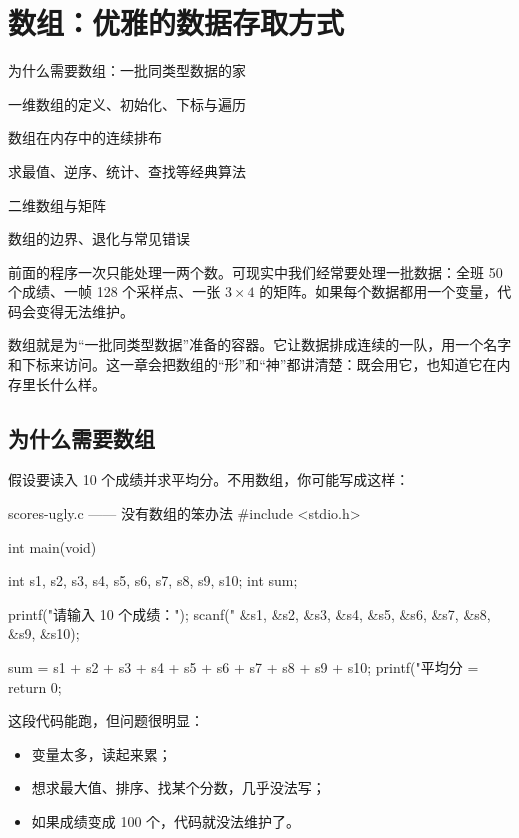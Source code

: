 \chapter{数组：优雅的数据存取方式}

\begin{introduction}
  \item 为什么需要数组：一批同类型数据的家
  \item 一维数组的定义、初始化、下标与遍历
  \item 数组在内存中的连续排布
  \item 求最值、逆序、统计、查找等经典算法
  \item 二维数组与矩阵
  \item 数组的边界、退化与常见错误
\end{introduction}


前面的程序一次只能处理一两个数。可现实中我们经常要处理一批数据：全班 50 个成绩、一帧 128 个采样点、一张 $3 \times 4$ 的矩阵。如果每个数据都用一个变量，代码会变得无法维护。

数组就是为“一批同类型数据”准备的容器。它让数据排成连续的一队，用一个名字和下标来访问。这一章会把数组的“形”和“神”都讲清楚：既会用它，也知道它在内存里长什么样。

\section{为什么需要数组}

假设要读入 10 个成绩并求平均分。不用数组，你可能写成这样：

\begin{codebox}{scores-ugly.c —— 没有数组的笨办法}
#include <stdio.h>

int main(void)
{
    int s1, s2, s3, s4, s5, s6, s7, s8, s9, s10;
    int sum;

    printf("请输入 10 个成绩：");
    scanf("%
          &s1, &s2, &s3, &s4, &s5,
          &s6, &s7, &s8, &s9, &s10);

    sum = s1 + s2 + s3 + s4 + s5 + s6 + s7 + s8 + s9 + s10;
    printf("平均分 = %
    return 0;
}
\end{codebox}

这段代码能跑，但问题很明显：

\begin{itemize}
  \item 变量太多，读起来累；
  \item 想求最大值、排序、找某个分数，几乎没法写；
  \item 如果成绩变成 100 个，代码就没法维护了。
\end{itemize}

